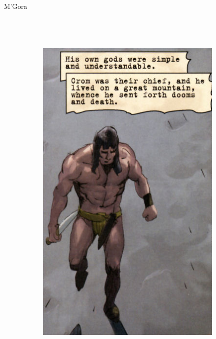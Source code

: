 \begin{frame}{M’Gora}
\begin{columns}
\begin{figure}[htp]
			~
			\begin{subfigure}[b]{0.27\textwidth}
				\includegraphics[width=\textwidth]{img/conan/DH}
			\end{subfigure}
			~
			\begin{subfigure}[b]{0.23\textwidth}

\end{subfigure}
\end{figure}
\end{columns}
\end{frame}
